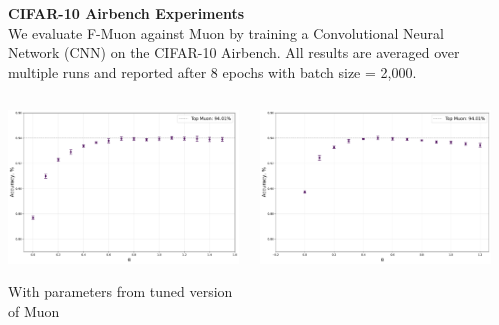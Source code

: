 \documentclass[fontsize=10pt]{beamer}
\begin{document}
\begin{frame}[fragile]
\begin{columns}[T]
\begin{column}{0.30\textwidth}
\end{column}
\hspace{0.02\textwidth}%

\begin{column}{0.30\textwidth}
\setlength{\parskip}{0.7em}
\setlength{\parindent}{0pt}
\Large

\textbf{\Huge\color{Zen}CIFAR-10 Airbench Experiments}\\[0.3em]

We evaluate F-Muon against Muon by training a Convolutional Neural Network (CNN) on the CIFAR-10 Airbench. All results are averaged over multiple runs and reported after 8 epochs with batch size = 2,000.

\begin{columns}[T,totalwidth=\textwidth]
      \begin{column}{0.48\textwidth}
        \includegraphics[width=\linewidth]{muon_tuned_diff_alpha.pdf}

        {\centering With parameters from tuned version of Muon\par}
      \end{column}
      \begin{column}{0.48\textwidth}
        \includegraphics[width=\linewidth]{fmuon_tuned_diff_alpha.pdf}


\end{column}
\end{columns}
\end{column}
\end{columns}
\end{frame}
\end{document}
